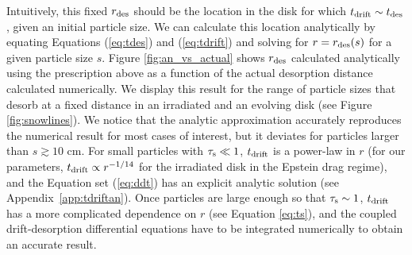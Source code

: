 \documentclass[apj]{emulateapj}
\newcommand{\App}[1]{Appendix~\ref{#1}}
\begin{document}
Intuitively, this fixed $r_{\rm des}$ should be the location in the disk for which $t_{\rm drift} \sim t_{\rm des}$, given an initial particle size. We can calculate this location analytically by equating Equations (\ref{eq:tdes}) and (\ref{eq:tdrift}) and solving for $r=r_{\rm des}(s)$ for a given particle size $s$. Figure \ref{fig:an_vs_actual} shows $r_{\rm des}$ calculated analytically using the prescription above as a function of the actual desorption distance calculated numerically. We display this result for the range of particle sizes that desorb at a fixed distance in an irradiated and an evolving disk (see Figure \ref{fig:snowlines}). We notice that the analytic approximation accurately reproduces the numerical result for most cases of interest, but it deviates for particles larger than $s \gtrsim10$ cm. For small particles with $\tau_{\rm s} \ll 1$, $t_{\rm drift}$ is a power-law in $r$ (for our parameters, $t_{\rm drift} \propto r^{-1/14}$ for the irradiated disk in the Epstein drag regime), and the Equation set (\ref{eq:ddt}) has an explicit analytic solution (see \App{app:tdriftan}). Once particles are large enough so that $\tau_{\rm s} \sim 1$, $t_{\rm drift}$ has a more complicated dependence on $r$ (see Equation \ref{eq:ts}), and the coupled drift-desorption differential equations have to be integrated numerically to obtain an accurate result. 


\end{document}
